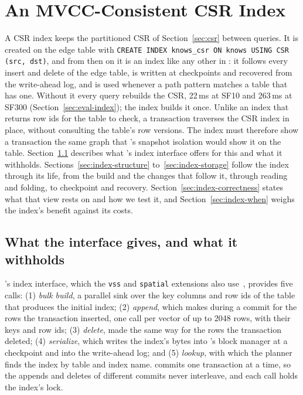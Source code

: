 \section{An MVCC-Consistent CSR Index}
\label{sec:index}


A CSR index keeps the partitioned CSR of Section~\ref{sec:csr} between queries. It is created on the edge table
with \texttt{CREATE INDEX knows\_csr ON knows USING CSR (src, dst)}, and from then on it is an index like any other
in \duckdb: it follows every insert and delete of the edge table, is written at checkpoints and recovered from the
write-ahead log, and is used whenever a path pattern matches a table that has one. Without it every query rebuilds the CSR, 22\,ms at SF10 and 263\,ms at SF300 (Section~\ref{sec:eval-index});
the index builds it once.
Unlike an index that returns row ids for the table to check, a
transaction traverses the CSR index in place, without consulting the table's row versions. The index must therefore
show a transaction the same graph that \duckdb's snapshot isolation would show it on the table. Section~\ref{sec:index-interface}
describes what \duckdb's index interface offers for this and what it withholds. Sections~\ref{sec:index-structure}
to~\ref{sec:index-storage} follow the index through its life, from the build and the changes that follow it, through
reading and folding, to checkpoint and recovery. Section~\ref{sec:index-correctness} states what that view rests on and how we test it, and Section~\ref{sec:index-when} weighs the index's benefit against its costs.

\subsection{What the interface gives, and what it withholds}
\label{sec:index-interface}

\duckdb's index interface, which the \texttt{vss} and \texttt{spatial} extensions also
use~\cite{duckdb_vss,duckdb_spatial}, provides five calls: (1) \emph{bulk build}, a parallel sink over the key columns
and row ids of the table that produces the initial index; (2) \emph{append}, which \duckdb makes during a commit for
the rows the transaction inserted, one call per vector of up to 2048 rows, with their keys and row ids; (3)
\emph{delete}, made the same way for the rows the transaction deleted; (4) \emph{serialize}, which writes the index's
bytes into \duckdb's block manager at a checkpoint and into the write-ahead log; and (5) \emph{lookup}, with which the
planner finds the index by table and index name. \duckdb commits one transaction at a time, so the appends and deletes
of different commits never interleave, and each call holds the index's lock.

